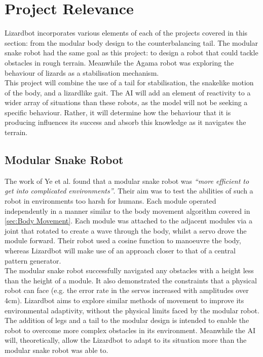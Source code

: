 \documentclass{article}
\begin{document}
\section{Project Relevance}
\label{sec:Project Relevance}
Lizardbot incorporates various elements of each of the projects covered in this section: from the modular body design to the counterbalancing tail. The modular snake robot had the same goal as this project: to design a robot that could tackle obstacles in rough terrain. Meanwhile the Agama robot was exploring the behaviour of lizards as a stabilisation mechanism.\\
This project will combine the use of a tail for stabilisation, the snakelike motion of the body, and a lizardlike gait. The AI will add an element of reactivity to a wider array of situations than these robots, as the model will not be seeking a specific behaviour. Rather, it will determine how the behaviour that it is producing influences its success and absorb this knowledge as it navigates the terrain.
\subsection{Modular Snake Robot}
\label{sec:Modular Snake Robot}
The work of Ye et al.  found that a modular snake robot was \textit{“more efficient to get into complicated environments”}. Their aim was to test the abilities of such a robot in environments too harsh for humans. Each module operated independently in a manner similar to the body movement algorithm covered in \ref{sec:Body Movement}. Each module was attached to the adjacent modules via a joint that rotated to create a wave through the body, whilst a servo drove the module forward. Their robot used a cosine function to manoeuvre the body, whereas Lizardbot will make use of an approach closer to that of a central pattern generator. \\
The modular snake robot successfully navigated any obstacles with a height less than the height of a module. It also demonstrated the constraints that a physical robot can face (e.g. the error rate in the servos increased with amplitudes over 4cm). Lizardbot aims to explore similar methods of movement to improve its environmental adaptivity, without the physical limits faced by the modular robot. The addition of legs and a tail to the modular design is intended to enable the robot to overcome more complex obstacles in its environment. Meanwhile the AI will, theoretically, allow the Lizardbot to adapt to its situation more than the modular snake robot was able to.
\end{document}
